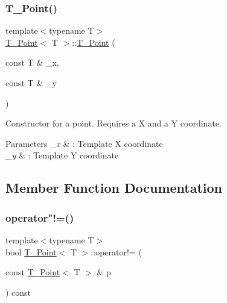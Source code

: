 \subsubsection{\texorpdfstring{T\+\_\+\+Point()}{T\_Point()}\hspace{0.1cm}{\footnotesize\ttfamily [4/4]}}
{\footnotesize\ttfamily template$<$typename T$>$ \\
\hyperlink{classT__Point}{T\+\_\+\+Point}$<$ T $>$\+::\hyperlink{classT__Point}{T\+\_\+\+Point} (\begin{DoxyParamCaption}\item[{const T \&}]{\+\_\+x,  }\item[{const T \&}]{\+\_\+y }\end{DoxyParamCaption})\hspace{0.3cm}{\ttfamily [inline]}}



Constructor for a point. Requires a X and a Y coordinate. 


\begin{DoxyParams}{Parameters}
{\em \+\_\+x} & \+: Template X coordinate \\
\hline
{\em \+\_\+y} & \+: Template Y coordinate \\
\hline
\end{DoxyParams}


\subsection{Member Function Documentation}
\mbox{\label{classT__Point_ab92f1605c6f5008b42105b4c7a7fc1b2}} 
\subsubsection{\texorpdfstring{operator"!=()}{operator!=()}}
{\footnotesize\ttfamily template$<$typename T$>$ \\
bool \hyperlink{classT__Point}{T\+\_\+\+Point}$<$ T $>$\+::operator!= (\begin{DoxyParamCaption}\item[{const \hyperlink{classT__Point}{T\+\_\+\+Point}$<$ T $>$ \&}]{p }\end{DoxyParamCaption}) const\hspace{0.3cm}{\ttfamily [inline]}}



